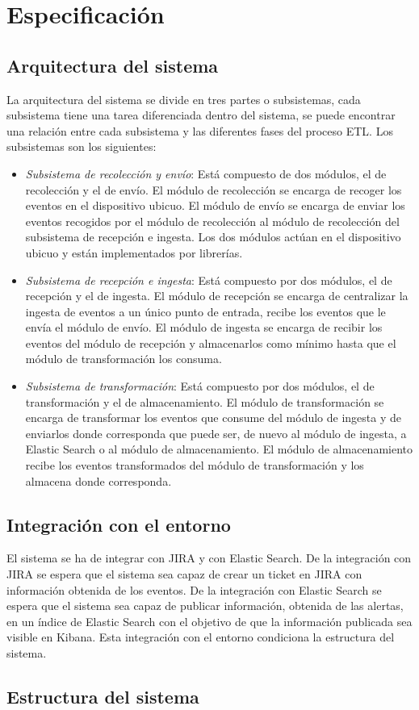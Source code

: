 \chapter{Especificación}

\section{Arquitectura del sistema}
La arquitectura del sistema se divide en tres partes o subsistemas, cada subsistema tiene una tarea diferenciada dentro del sistema, se puede encontrar una relación entre cada subsistema y las diferentes fases del proceso ETL. Los subsistemas son los siguientes:

\begin{itemize}
	\item \textit{Subsistema de recolección y envío}: Está compuesto de dos módulos, el de recolección y el de envío. El módulo de recolección se encarga de recoger los eventos en el dispositivo ubicuo. El módulo de envío se encarga de enviar los eventos recogidos por el módulo de recolección al módulo de recolección del subsistema de recepción e ingesta. Los dos módulos actúan en el dispositivo ubicuo y están implementados por librerías.
	
	\item \textit{Subsistema de recepción e ingesta}: Está compuesto por dos módulos, el de recepción y el de ingesta. El módulo de recepción se encarga de centralizar la ingesta de eventos a un único punto de entrada, recibe los eventos que le envía el módulo de envío. El módulo de ingesta se encarga de recibir los eventos del módulo de recepción y almacenarlos como mínimo hasta que el módulo de transformación los consuma.

	\item  \textit{Subsistema de transformación}:  Está compuesto por dos módulos, el de transformación y el de almacenamiento. El módulo de transformación se encarga de transformar los eventos que consume del módulo de ingesta y de enviarlos donde corresponda que puede ser, de nuevo al módulo de ingesta, a Elastic Search o al módulo de almacenamiento. El módulo de almacenamiento recibe los eventos transformados del módulo de transformación y los almacena donde corresponda.
\end{itemize}


\section{Integración con el entorno}
El sistema se ha de integrar con JIRA y con Elastic Search. De la integración con JIRA se espera que el sistema sea capaz de crear un ticket en JIRA con información obtenida de los eventos. De la integración con Elastic Search se espera que el sistema sea capaz de publicar información, obtenida de las alertas, en un índice de Elastic Search con el objetivo de que la información publicada sea visible en Kibana. Esta integración con el entorno condiciona la estructura del sistema.

\section{Estructura del sistema}

